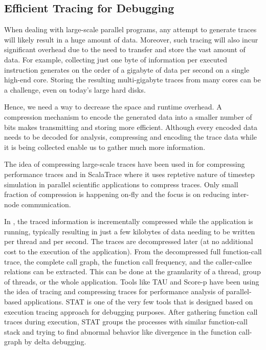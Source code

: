 \subsection{Efficient Tracing for Debugging}
When dealing with large-scale parallel programs, any attempt to generate traces will likely result in a huge amount of data. Moreover, such tracing will also incur significant overhead due to the need to transfer and store the vast amount of data. For example, collecting just one byte of information per executed instruction generates on the order of a gigabyte of data per second on a single high-end core.  Storing the resulting multi-gigabyte traces from many cores can be a challenge, even on today's large hard disks.

Hence, we need a way to decrease the space and runtime overhead. A compression mechanism to encode the generated data into a smaller number of bits makes transmitting and storing more efficient. Although every encoded data needs to be decoded for analysis, compressing and encoding the trace data while it is being collected enable us to gather much more information.

The idea of compressing large-scale  traces have been used in \cite{eventflowgraph} for compressing performance traces and in ScalaTrace\cite{scalatrace} where it uses reptetive nature of timestep simulation in parallel scientific applications to compress traces\cite{freitag}. Only small fraction of compression is happening on-fly and the focus is on reducing inter-node communication. 

In \parlot, the traced information is incrementally compressed while the application is running, typically resulting in just a few kilobytes of data needing to be written per thread and per second.
The traces are decompressed later (at no additional cost to the  execution of the application). From the decompressed full function-call trace, the complete call graph, the function call frequency, and the caller-callee relations can be extracted. This can be done at the granularity of a thread, group of threads, or the whole application. 
Tools like TAU\cite{tau} and Score-p\cite{scorep} have been using the idea of tracing and compressing traces for performance analysis of parallel-based applications. STAT\cite{stat} is one of the very few tools that is designed based on execution tracing approach for debugging purposes. After gathering function call traces during execution, STAT groups the processes with similar function-call stack and trying to find abnormal behavior like divergence in the function call-graph by delta debugging.


